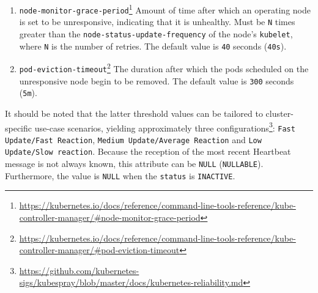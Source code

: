 \begin{itemize}
\begin{enumerate}
      \item \texttt{node-monitor-grace-period}\footnote{\url{https://kubernetes.io/docs/reference/command-line-tools-reference/kube-controller-manager/\#node-monitor-grace-period}}
        \newline
        Amount of time after which an operating node is set to be unresponsive, indicating
        that it is unhealthy. Must be \texttt{N} times greater than the \texttt{node-status-update-frequency}
        of the node's \texttt{kubelet}, where \texttt{N} is the number of retries.
        \newline
        The default value is \texttt{40} seconds (\texttt{40s}).

      \item \texttt{pod-eviction-timeout}\footnote{\url{https://kubernetes.io/docs/reference/command-line-tools-reference/kube-controller-manager/\#pod-eviction-timeout}}
        \newline
        The duration after which the pods scheduled on the unresponsive node
        begin to be removed.
        \newline
        The default value is \texttt{300} seconds (\texttt{5m}).
    \end{enumerate}
    It should be noted that the latter threshold values can be tailored to cluster-specific
    use-case scenarios, yielding approximately three configurations\footnote{\url{https://github.com/kubernetes-sigs/kubespray/blob/master/docs/kubernetes-reliability.md}}:
    \texttt{Fast Update/Fast Reaction}, \texttt{Medium Update/Average Reaction}
    and \texttt{Low Update/Slow reaction}.
    \newline
    Because the reception of the most recent Heartbeat message is not always
    known, this attribute can be \texttt{NULL} (\texttt{NULLABLE}). Furthermore,
    the value is \texttt{NULL} when the \texttt{status} is \texttt{INACTIVE}.


\end{itemize}
